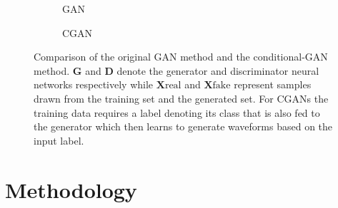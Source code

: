 \documentclass[12pt]{iopart}
\newcommand{\chris}[1]{\textbf{\textcolor{green}{CHRIS: #1}}}
\begin{document}
\begin{figure}[h!]
    \begin{subfigure}{.5\textwidth}
     \centering
        
        \caption{GAN}
    \end{subfigure}
    \begin{subfigure}{.5\textwidth}
     \centering
        
        \caption{CGAN}
    \end{subfigure}
    \caption{Comparison of the original GAN method and the
conditional-GAN method. $\textbf{G}$ and $\textbf{D}$ denote the generator and discriminator neural networks respectively while $\textbf{X} \text{real}$ and $\textbf{X} \text{fake}$ represent samples drawn from the training set and the generated set. For CGANs the training data requires a label denoting
its class that is also fed to the generator which then learns to generate
waveforms based on the input label.}

\label{fig:gan_comparison}
\end{figure}

\section{Methodology}

\end{document}
